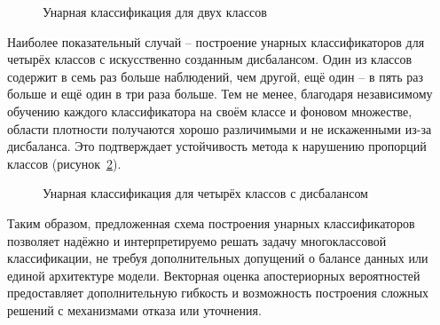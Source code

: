 \begin{figure}[ht]
    \caption{Унарная классификация для двух классов}
    \label{fig:unary_two}
\end{figure}

Наиболее показательный случай -- построение унарных классификаторов для четырёх классов с искусственно созданным дисбалансом. Один из классов содержит в семь раз больше наблюдений, чем другой, ещё один -- в пять раз больше и ещё один в три раза больше. Тем не менее, благодаря независимому обучению каждого классификатора на своём классе и фоновом множестве, области плотности получаются хорошо различимыми и не искаженными из-за дисбаланса. Это подтверждает устойчивость метода к нарушению пропорций классов (рисунок~\cref{fig:unary_four}).

\begin{figure}[ht]
    \caption{Унарная классификация для четырёх классов с дисбалансом}
    \label{fig:unary_four}
\end{figure}

Таким образом, предложенная схема построения унарных классификаторов позволяет надёжно и интерпретируемо решать задачу многоклассовой классификации, не требуя дополнительных допущений о балансе данных или единой архитектуре модели. Векторная оценка апостериорных вероятностей предоставляет дополнительную гибкость и возможность построения сложных решений с механизмами отказа или уточнения.
